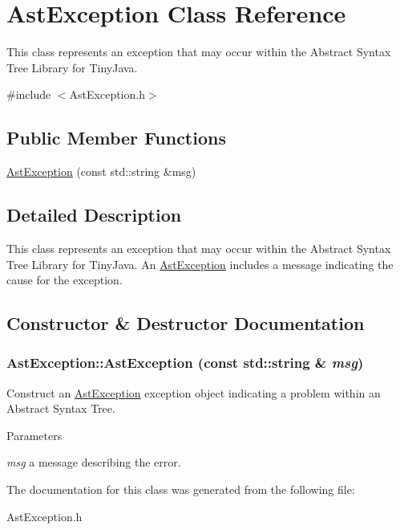 \hypertarget{classAstException}{
\section{AstException Class Reference}
\label{classAstException}
}


This class represents an exception that may occur within the Abstract Syntax Tree Library for TinyJava.  


{\ttfamily \#include $<$AstException.h$>$}\subsection*{Public Member Functions}
\begin{DoxyCompactItemize}
\item 
\hyperlink{classAstException_aff6bd0191954f4c9d5bc2c1608d3e94e}{AstException} (const std::string \&msg)
\end{DoxyCompactItemize}


\subsection{Detailed Description}
This class represents an exception that may occur within the Abstract Syntax Tree Library for TinyJava. An \hyperlink{classAstException}{AstException} includes a message indicating the cause for the exception. 

\subsection{Constructor \& Destructor Documentation}
\hypertarget{classAstException_aff6bd0191954f4c9d5bc2c1608d3e94e}{
\subsubsection[{AstException}]{\setlength{\rightskip}{0pt plus 5cm}AstException::AstException (const std::string \& {\em msg})}}
\label{classAstException_aff6bd0191954f4c9d5bc2c1608d3e94e}
Construct an \hyperlink{classAstException}{AstException} exception object indicating a problem within an Abstract Syntax Tree.


\begin{DoxyParams}{Parameters}
\item[{\em msg}]a message describing the error. \end{DoxyParams}


The documentation for this class was generated from the following file:\begin{DoxyCompactItemize}
\item 
AstException.h\end{DoxyCompactItemize}
